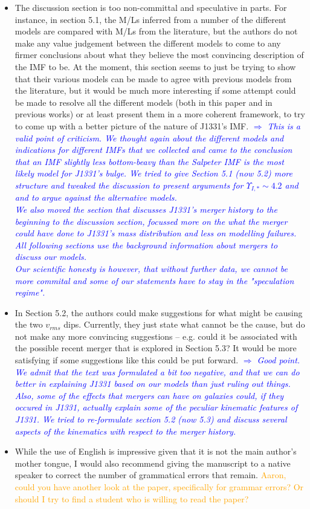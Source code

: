 \documentclass[10pt,a4paper]{article}
\newcommand{\Comment}[1]{\textsl{\textcolor{Blue}{$\Longrightarrow$ {#1}}}}
\newcommand{\Aaron}[1]{\textcolor{Orange}{#1}}
\begin{document}
\begin{itemize}
\item The discussion section is too non-committal and speculative in parts. For instance,
in section 5.1, the M/Ls inferred from a number of the different models are compared
with M/Ls from the literature, but the authors do not make any value judgement
between the different models to come to any firmer conclusions about what they
believe the most convincing description of the IMF to be. At the moment, this
section seems to just be trying to show that their various models can be made to
agree with previous models from the literature, but it would be much more
interesting if some attempt could be made to resolve all the different models (both
in this paper and in previous works) or at least present them in a more coherent
framework, to try to come up with a better picture of the nature of J1331's IMF. \Comment{This is a valid point of criticism. We thought again about the different models and indications for different IMFs that we collected and came to the conclusion that an IMF slightly less bottom-beavy than the Salpeter IMF is the most likely model for J1331's bulge. We tried to give Section 5.1 (now 5.2) more structure and tweaked the discussion to present arguments for $\Upsilon_{I,*} \sim 4.2$ and and to argue against the alternative models.\\We also moved the section that discusses J1331's merger history to the beginning to the discussion section, focussed more on the what the merger could have done to J1331's mass distribution and less on modelling failures. All following sections use the background information about mergers to discuss our models.\\Our scientific honesty is however, that without further data, we cannot be more commital and some of our statements have to stay in the "speculation regime".}

\item In Section 5.2, the authors could make suggestions for what might be causing the two
$v_{rms}$ dips. Currently, they just state what cannot be the cause, but do not make any
more convincing suggestions – e.g. could it be associated with the possible recent
merger that is explored in Section 5.3? It would be more satisfying if some
suggestions like this could be put forward. \Comment{Good point. We admit that the text was formulated a bit too negative, and that we can do better in explaining J1331 based on our models than just ruling out things. Also, some of the effects that mergers can have on galaxies \emph{could}, if they occured in J1331, actually explain some of the peculiar kinematic features of J1331. We tried to re-formulate section 5.2 (now 5.3) and discuss several aspects of the kinematics with respect to the merger history.}

\item While the use of English is impressive given that it is not the main author's mother
tongue, I would also recommend giving the manuscript to a native speaker to correct
the number of grammatical errors that remain. \Aaron{Aaron, could you have another look at the paper, specifically for grammar errors? Or should I try to find a student who is willing to read the paper?}

\end{itemize}
\end{document}
